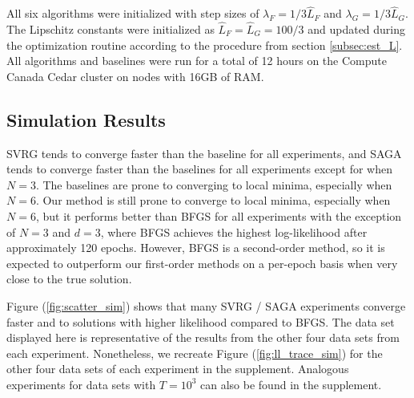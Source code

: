 All six algorithms were initialized with step sizes of $\lambda_F = 1/3 \hat L_F$ and $\lambda_G = 1/3 \hat L_G$. The Lipschitz constants were initialized as $\hat L_F = \hat L_G = 100/3$ and updated during the optimization routine according to the procedure from section \ref{subsec:est_L}. 
%
All algorithms and baselines were run for a total of 12 hours on the Compute Canada Cedar cluster on nodes with 16GB of RAM.

\subsection{Simulation Results}


SVRG tends to converge faster than the baseline for all experiments, and SAGA tends to converge faster than the baselines for all experiments except for when $N=3$. The baselines are prone to converging to local minima, especially when $N=6$. Our method is still prone to converge to local minima, especially when $N=6$, but it performs better than BFGS for all experiments with the exception of $N = 3$ and $d = 3$, where BFGS achieves the highest log-likelihood after approximately 120 epochs. However, BFGS is a second-order method, so it is expected to outperform our first-order methods on a per-epoch basis when very close to the true solution.

Figure (\ref{fig:scatter_sim}) shows that many SVRG / SAGA experiments converge faster and to solutions with higher likelihood compared to BFGS. 
%
The data set displayed here is representative of the results from the other four data sets from each experiment. Nonetheless, we recreate Figure (\ref{fig:ll_trace_sim}) for the other four data sets of each experiment in the supplement. Analogous experiments for data sets with $T=10^3$ can also be found in the supplement. 

